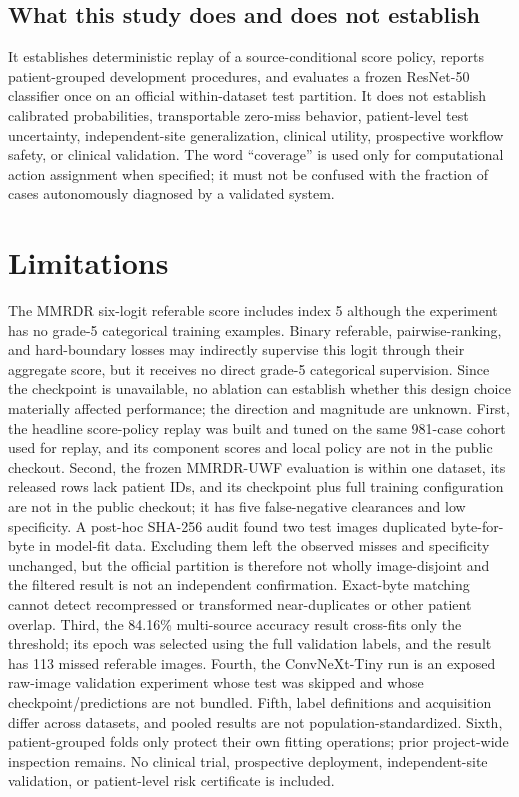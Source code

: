 \documentclass[11pt]{article}
\begin{document}
\subsection{What this study does and does not establish}
It establishes deterministic replay of a source-conditional score policy, reports patient-grouped development procedures, and evaluates a frozen ResNet-50 classifier once on an official within-dataset test partition. It does not establish calibrated probabilities, transportable zero-miss behavior, patient-level test uncertainty, independent-site generalization, clinical utility, prospective workflow safety, or clinical validation. The word ``coverage'' is used only for computational action assignment when specified; it must not be confused with the fraction of cases autonomously diagnosed by a validated system.

\section{Limitations}
The MMRDR six-logit referable score includes index 5 although the experiment has no grade-5 categorical training examples. Binary referable, pairwise-ranking, and hard-boundary losses may indirectly supervise this logit through their aggregate score, but it receives no direct grade-5 categorical supervision. Since the checkpoint is unavailable, no ablation can establish whether this design choice materially affected performance; the direction and magnitude are unknown.
First, the headline score-policy replay was built and tuned on the same 981-case cohort used for replay, and its component scores and local policy are not in the public checkout. Second, the frozen MMRDR-UWF evaluation is within one dataset, its released rows lack patient IDs, and its checkpoint plus full training configuration are not in the public checkout; it has five false-negative clearances and low specificity. A post-hoc SHA-256 audit found two test images duplicated byte-for-byte in model-fit data. Excluding them left the observed misses and specificity unchanged, but the official partition is therefore not wholly image-disjoint and the filtered result is not an independent confirmation. Exact-byte matching cannot detect recompressed or transformed near-duplicates or other patient overlap. Third, the 84.16\% multi-source accuracy result cross-fits only the threshold; its epoch was selected using the full validation labels, and the result has 113 missed referable images. Fourth, the ConvNeXt-Tiny run is an exposed raw-image validation experiment whose test was skipped and whose checkpoint/predictions are not bundled. Fifth, label definitions and acquisition differ across datasets, and pooled results are not population-standardized. Sixth, patient-grouped folds only protect their own fitting operations; prior project-wide inspection remains. No clinical trial, prospective deployment, independent-site validation, or patient-level risk certificate is included.
\end{document}
